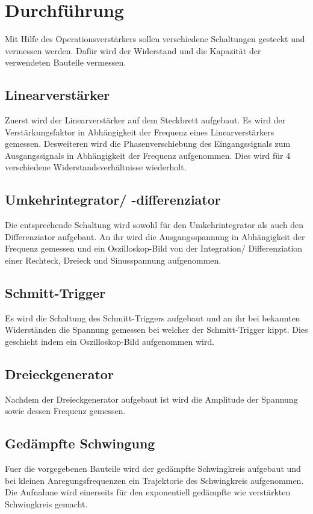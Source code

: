 \section{Durchführung}%
\label{sec:durchführung}
Mit Hilfe des Operationsverstärkers sollen verschiedene Schaltungen gesteckt
und vermessen werden.
Dafür wird der Widerstand und die Kapazität der verwendeten Bauteile
vermessen.

\subsection{Linearverstärker}%
\label{sub:linearverstaerker}
Zuerst wird der Linearverstärker auf dem Steckbrett aufgebaut.
Es wird der Verstärkungsfaktor in Abhängigkeit der Frequenz eines
Linearverstärkers gemessen.
Desweiteren wird die Phasenverschiebung des Eingangssignals zum Ausgangssignals
in Abhängigkeit der Frequenz aufgenommen.
Dies wird für 4 verschiedene Widerstandsverhältnisse wiederholt.

\subsection{Umkehrintegrator/ -differenziator}%
\label{sub:umkehrintegrator_differenziator}
Die entsprechende Schaltung wird sowohl für den Umkehrintegrator als auch den
Differenziator aufgebaut. 
An ihr wird die Ausgangsspannung in Abhängigkeit der Frequenz gemessen und ein
Oszilloskop-Bild von der Integration/ Differenziation einer Rechteck, Dreieck
und Sinusspannung aufgenommen.

\subsection{Schmitt-Trigger}%
\label{sub:schmitt_trigger}
Es wird die Schaltung des Schmitt-Triggers aufgebaut und an ihr bei bekannten
Widerständen die Spannung gemessen bei welcher der Schmitt-Trigger kippt.
Dies geschieht indem ein Oszilloskop-Bild aufgenommen wird.

\subsection{Dreieckgenerator}%
\label{sub:dreieckgenerator}
Nachdem der Dreieckgenerator aufgebaut ist wird die Amplitude der
Spannung sowie dessen Frequenz gemessen.

\subsection{Gedämpfte Schwingung}%
\label{sub:gedaempfte_schwingung}
Fuer die vorgegebenen Bauteile wird der gedämpfte Schwingkreis aufgebaut und
bei kleinen Anregungsfrequenzen ein Trajektorie des Schwingkreis aufgenommen.
Die Aufnahme wird einerseits für den exponentiell gedämpfte wie verstärkten
Schwingkreis gemacht.
